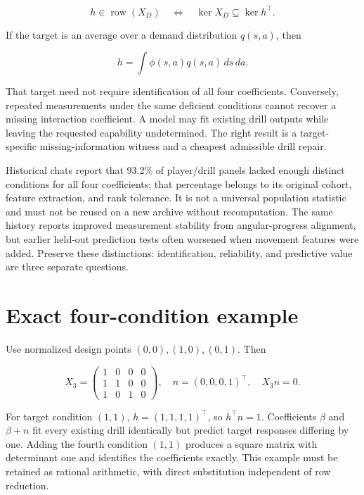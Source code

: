 \documentclass[
  11pt,
  a4paper,
]{report}
\begin{document}
\[
 \boxed{h\in\operatorname{row}(X_D)}
 \quad\Longleftrightarrow\quad
 \ker X_D\subseteq\ker h^\top.
\]

If the target is an average over a demand distribution \(q(s,a)\), then

\[
 h=\int\phi(s,a)q(s,a)\,ds\,da.
\]

That target need not require identification of all four coefficients.
Conversely, repeated measurements under the same deficient conditions
cannot recover a missing interaction coefficient. A model may fit
existing drill outputs while leaving the requested capability
undetermined. The right result is a target-specific missing-information
witness and a cheapest admissible drill repair.

Historical chats report that 93.2\% of player/drill panels lacked enough
distinct conditions for all four coefficients; that percentage belongs
to its original cohort, feature extraction, and rank tolerance. It is
not a universal population statistic and must not be reused on a new
archive without recomputation. The same history reports improved
measurement stability from angular-progress alignment, but earlier
held-out prediction tests often worsened when movement features were
added. Preserve these distinctions: identification, reliability, and
predictive value are three separate questions.

\hypertarget{exact-four-condition-example}{%
\section{Exact four-condition
example}\label{exact-four-condition-example}}

Use normalized design points \((0,0),(1,0),(0,1)\). Then

\[
 X_3=\begin{pmatrix}1&0&0&0\\1&1&0&0\\1&0&1&0\end{pmatrix},
 \quad n=(0,0,0,1)^\top,
 \quad X_3n=0.
\]

For target condition \((1,1)\), \(h=(1,1,1,1)^\top\), so \(h^\top n=1\).
Coefficients \(\beta\) and \(\beta+n\) fit every existing drill
identically but predict target responses differing by one. Adding the
fourth condition \((1,1)\) produces a square matrix with determinant one
and identifies the coefficients exactly. This example must be retained
as rational arithmetic, with direct substitution independent of row
reduction.
\end{document}
